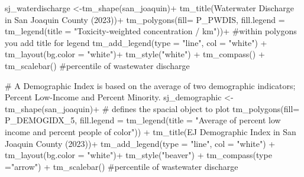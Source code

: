 \documentclass[
  letterpaper,
  DIV=11,
  numbers=noendperiod]{scrartcl}
\newenvironment{Shaded}{\begin{snugshade}}{\end{snugshade}}
\newcommand{\AttributeTok}[1]{\textcolor[rgb]{0.40,0.45,0.13}{#1}}
\newcommand{\CommentTok}[1]{\textcolor[rgb]{0.37,0.37,0.37}{#1}}
\newcommand{\FunctionTok}[1]{\textcolor[rgb]{0.28,0.35,0.67}{#1}}
\newcommand{\NormalTok}[1]{\textcolor[rgb]{0.00,0.23,0.31}{#1}}
\newcommand{\OtherTok}[1]{\textcolor[rgb]{0.00,0.23,0.31}{#1}}
\newcommand{\SpecialCharTok}[1]{\textcolor[rgb]{0.37,0.37,0.37}{#1}}
\newcommand{\StringTok}[1]{\textcolor[rgb]{0.13,0.47,0.30}{#1}}
\begin{document}
\begin{Shaded}
\begin{Highlighting}[]
\NormalTok{sj\_waterdischarge }\OtherTok{\textless{}{-}}\FunctionTok{tm\_shape}\NormalTok{(san\_joaquin)}\SpecialCharTok{+}  
  \FunctionTok{tm\_title}\NormalTok{(}\StringTok{\textquotesingle{}Waterwater Discharge in San Joaquin County (2023)\textquotesingle{}}\NormalTok{)}\SpecialCharTok{+}
  \FunctionTok{tm\_polygons}\NormalTok{(}\AttributeTok{fill=} \StringTok{\textquotesingle{}P\_PWDIS\textquotesingle{}}\NormalTok{, }\AttributeTok{fill.legend =} \FunctionTok{tm\_legend}\NormalTok{(}\AttributeTok{title =} \StringTok{"Toxicity{-}weighted concentration / km"}\NormalTok{))}\SpecialCharTok{+} \CommentTok{\#within polygons you add title for legend}
  \FunctionTok{tm\_add\_legend}\NormalTok{(}\AttributeTok{type =} \StringTok{"line"}\NormalTok{, }\AttributeTok{col =} \StringTok{"white"}\NormalTok{) }\SpecialCharTok{+}
  \FunctionTok{tm\_layout}\NormalTok{(}\AttributeTok{bg.color =} \StringTok{"white"}\NormalTok{)}\SpecialCharTok{+}
  \FunctionTok{tm\_style}\NormalTok{(}\StringTok{"white"}\NormalTok{) }\SpecialCharTok{+}
  \FunctionTok{tm\_compass}\NormalTok{() }\SpecialCharTok{+}
  \FunctionTok{tm\_scalebar}\NormalTok{() }\CommentTok{\#percentile of wastewater discharge}
\end{Highlighting}
\end{Shaded}

\begin{Shaded}
\begin{Highlighting}[]
\CommentTok{\# A Demographic Index is based on the average of two demographic indicators; Percent Low{-}Income and Percent Minority.}
\NormalTok{sj\_demographic }\OtherTok{\textless{}{-}} \FunctionTok{tm\_shape}\NormalTok{(san\_joaquin)}\SpecialCharTok{+} \CommentTok{\# defines the spacial object to plot }
    \FunctionTok{tm\_polygons}\NormalTok{(}\AttributeTok{fill=} \StringTok{\textquotesingle{}P\_DEMOGIDX\_5\textquotesingle{}}\NormalTok{, }\AttributeTok{fill.legend =} \FunctionTok{tm\_legend}\NormalTok{(}\AttributeTok{title =} \StringTok{"Average of percent}
\StringTok{low income and percent people of color"}\NormalTok{)) }\SpecialCharTok{+}
    \FunctionTok{tm\_title}\NormalTok{(}\StringTok{\textquotesingle{}EJ Demographic Index in San Joaquin County (2023)\textquotesingle{}}\NormalTok{)}\SpecialCharTok{+}
    \FunctionTok{tm\_add\_legend}\NormalTok{(}\AttributeTok{type =} \StringTok{"line"}\NormalTok{, }\AttributeTok{col =} \StringTok{"white"}\NormalTok{) }\SpecialCharTok{+}
    \FunctionTok{tm\_layout}\NormalTok{(}\AttributeTok{bg.color =} \StringTok{"white"}\NormalTok{)}\SpecialCharTok{+}
    \FunctionTok{tm\_style}\NormalTok{(}\StringTok{"beaver"}\NormalTok{) }\SpecialCharTok{+}
    \FunctionTok{tm\_compass}\NormalTok{(}\AttributeTok{type =}\StringTok{"arrow"}\NormalTok{) }\SpecialCharTok{+}
    \FunctionTok{tm\_scalebar}\NormalTok{() }\CommentTok{\#percentile of wastewater discharge}
\end{Highlighting}
\end{Shaded}
\end{document}
